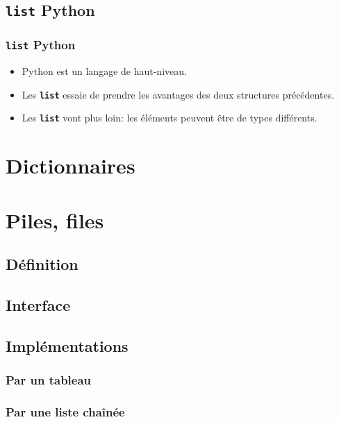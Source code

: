 \documentclass[svgnames,11pt]{beamer}
\begin{document}
\subsection{\textbf{\texttt{list} Python}}
\begin{frame}
    \frametitle{\textbf{\texttt{list} Python}}

    \begin{aretenir}[Observations]
        \begin{itemize}
            \item Python est un langage de haut-niveau.
            \item Les \textbf{\texttt{list}} essaie de prendre les avantages des deux structures précédentes.
            \item Les \textbf{\texttt{list}} vont plus loin: les éléments peuvent être de types différents.
        \end{itemize}
    \end{aretenir}

\end{frame}
\section{Dictionnaires}
\section{Piles, files}
\subsection{Définition}
\subsection{Interface}
\subsection{Implémentations}
\subsubsection{Par un tableau}
\subsubsection{Par une liste chaînée}
\end{document}
